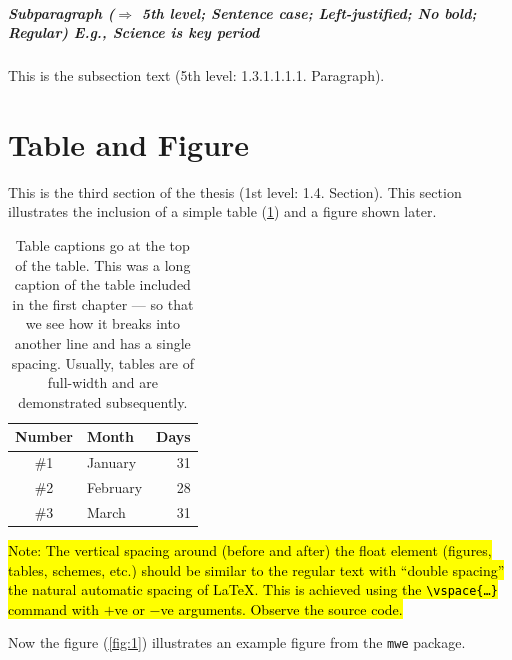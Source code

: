 \documentclass[ms-thesis,mathdesign,12pt,showgrid]{ndsu-thesis-2022}
\begin{document}
\subparagraph{Subparagraph ($\Rightarrow$ 5th level; Sentence case; Left-justified; No bold; Regular) E.g., Science is key period}
This is the subsection text (5th level: 1.3.1.1.1.1. Paragraph). \kant[7]

\section{Table and Figure}
This is the third section of the thesis (1st level: 1.4. Section). This section illustrates the inclusion of a simple table (\cref{tab:1}) and a figure shown later.

\begin{table}[h]
\centering
\caption{Table captions go at the top of the table. This was a long caption of the table included in the first chapter --- so that we see how it breaks into another line and has a single spacing. Usually, tables are of full-width and are demonstrated subsequently.}
\vo%
\begin{tabular}{clr}
\toprule
Number & Month & Days\\
\midrule
\#1 & January    & 31\\
\#2 & February   & 28\\
\#3 & March      & 31\\
\bottomrule
\end{tabular}
\label{tab:1}
\end{table}	

\vo
\kant[7]

\hl{Note: The vertical spacing around (before and after) the float element (figures, tables, schemes, etc.) should be similar to the regular text with ``double spacing'' the natural automatic spacing of \LaTeX. This is achieved using the \texttt{\textbackslash vspace\{\ldots\}} command with $+$ve or $-$ve arguments. Observe the source code.}

Now the figure (\cref{fig:1}) illustrates an example figure from the \texttt{mwe} package.

\vo
{}	

\vth%
\kant[8-9]

\end{document}
